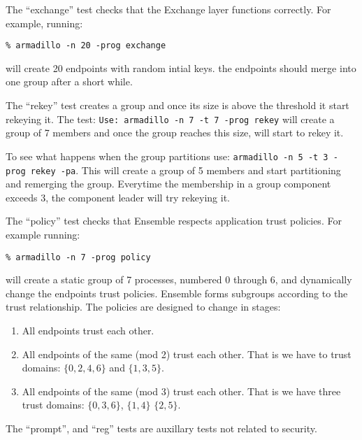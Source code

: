The ``exchange'' test checks that the Exchange layer functions
correctly. For example, running:
\begin{verbatim}
% armadillo -n 20 -prog exchange
\end{verbatim}
will create 20 endpoints with random intial keys. the endpoints should
merge into one group after a short while.

The ``rekey'' test creates a group and once its size is above the
threshold it start rekeying it. The test: {\tt Use: armadillo -n 7 -t
7 -prog rekey} will create a group of 7 members and once the group
reaches this size, will start to rekey it.
		
To see what happens when the group partitions use: {\tt armadillo -n 5
-t 3 -prog rekey -pa}. This will create a group of 5 members and start
partitioning and remerging the group. Everytime the membership in a
group component exceeds 3, the component leader will try rekeying it. 

The ``policy'' test checks that Ensemble respects application trust
policies. For example running:
\begin{verbatim}
% armadillo -n 7 -prog policy
\end{verbatim}
will create a static group of 7 processes, numbered 0 through 6, and
dynamically change the endpoints trust policies. Ensemble forms
subgroups according to the trust relationship. The policies are
designed to change in stages:
\begin{enumerate}
\item All endpoints trust each other.
\item 
All endpoints of the same (mod 2) trust each other. That is we
have to trust domains: $\{0,2,4,6\}$ and $\{1,3,5\}$.
\item 
All endpoints of the same (mod 3) trust each other. That is we
have three trust domains: $\{0,3,6\}$, $\{1,4\}$ $\{2,5\}$.
\end{enumerate}

The ``prompt'', and ``reg'' tests are auxillary tests not related
to security. 


